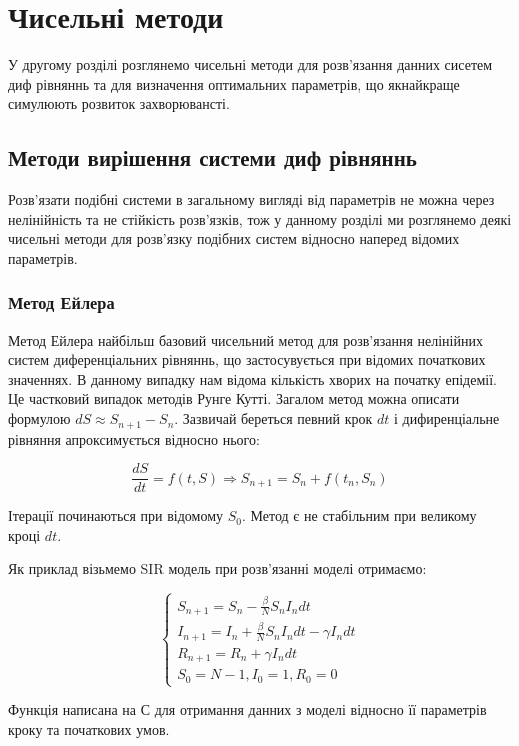 
\chapter{Чисельні методи}


У другому розділі розглянемо чисельні методи для розв'язання 
данних сисетем диф рівняннь та для визначення оптимальних параметрів, що 
якнайкраще симулюють розвиток захворювансті.

\section{Методи вирішення системи диф рівняннь}


Розв'язати подібні системи в загальному вигляді від параметрів не можна 
через нелінійність та не стійкість розв'язків, тож у данному розділі ми 
розглянемо деякі чисельні методи для розв'язку подібних систем відносно 
наперед відомих параметрів. 

\subsection{Метод Ейлера}


Метод Ейлера найбільш базовий чисельний метод для розв'язання нелінійних
систем диференціальних рівняннь, що застосувується при відомих початкових
значеннях. 
В данному випадку нам відома кількість хворих на початку епідемії.
Це частковий випадок методів Рунге Кутті. 
Загалом метод можна описати формулою $dS \approx S_{n+1} - S_n$.
Зазвичай береться певний крок $dt$ і дифиренціальне рівняння 
апроксимується відносно нього:

$$\frac{dS}{dt} = f(t, S) \Rightarrow 
S_{n+1} = S_n + f(t_n, S_n)$$

Ітерації починаються при відомому $S_0$. Метод є не стабільним при великому 
кроці $dt$.\cite{iserles_first_1996,autar_textbook_nodate}

Як приклад візьмемо SIR модель при розв'язанні моделі отримаємо:

$$
\begin{cases}
    S_{n+1} = S_n - \frac{\beta}{N} S_n I_n dt \\
    I_{n+1} = I_n + \frac{\beta}{N} S_n I_n dt - \gamma I_n dt \\
    R_{n+1} = R_n + \gamma I_n dt \\
    S_0 = N - 1, I_0 = 1, R_0 = 0
\end{cases}
$$


Функція написана на С для отримання данних з моделі відносно її параметрів 
кроку та початкових умов. 


